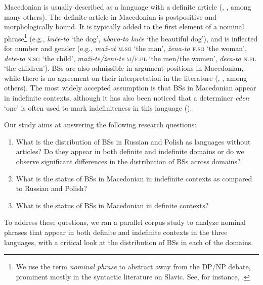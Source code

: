 \documentclass[output=paper,colorlinks,citecolor=brown]{langscibook}
\begin{document}
Macedonian is usually described as a language with a definite article (\citealt{Friedman1993}, \citealt{Tomić2006}, among many others). The definite article in Macedonian is postpositive and morphologically bound. It is typically added to the first element of a nominal phrase\footnote{We use the term \textit{nominal phrase} to abstract away from the DP/NP debate, prominent mostly in the syntactic literature on Slavic. See, for instance, \citet{bor+:boskovic08}.} (e.g., \textit{kuče-to} \lq the dog', \textit{ubavo-to kuče} \lq the beautiful dog'), and is inflected for number and gender (e.g., \textit{maž-ot} \textsc{m.sg} \lq the man', \textit{žena-ta} \textsc{f.sg} \lq the woman', \textit{dete-to} \textsc{n.sg} \lq the child', \textit{maži-te/ženi-te }\textsc{m/f.pl} \lq the men/the women', \textit{deca-ta} \textsc{n.pl} \lq the children').  BSs are also admissible in argument positions in Macedonian, while there is no agreement on their interpretation in the literature (\citealt{Weiss2004}, \citealt{Topolinjska2009}, among others). The most widely accepted assumption is that BSs in Macedonian appear in indefinite contexts, although it has also been noticed that a determiner \textit{eden} \lq one' is often used to mark indefiniteness in this language (\citealt{Tomić2006}).

Our study aims at answering the following research questions:
\begin{enumerate}
    \item What is the distribution of BSs in Russian and Polish as languages without articles? Do they appear in both definite and indefinite domains or do we observe significant differences in the distribution of BSs across domains? 
\item What is the status of BSs in Macedonian in indefinite contexts as compared to Russian and Polish?
\item What is the status of BSs in Macedonian in definite contexts? 
\end{enumerate}

\noindent To address these questions, we ran a parallel corpus study to analyze nominal phrases that appear in both definite and indefinite contexts in the three languages, with a critical look at the distribution of BSs in each of the domains. 
\end{document}
